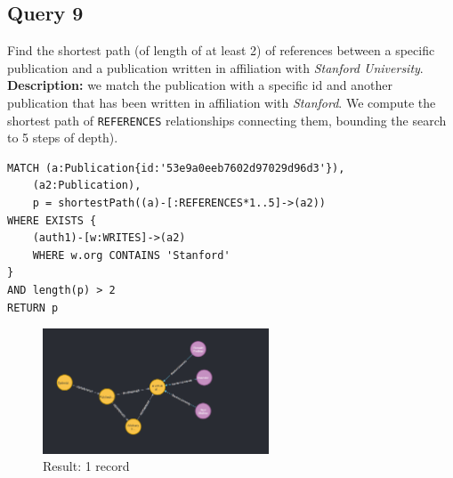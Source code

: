 \documentclass{Configuration_Files/PoliMi3i_thesis}
\begin{document}
\subsection{Query 9}
Find the shortest path (of length of at least 2) of references between a specific publication and a publication written in
affiliation with \emph{Stanford University}.\\
\textbf{Description:} we match the publication with a specific id and another publication that has been written in
affiliation with \emph{Stanford}. We compute the shortest path of \verb |REFERENCES| relationships connecting them, bounding
the search to 5 steps of depth).
\begin{lstlisting}[language=cypher, label=lst:cypher-example]
MATCH (a:Publication{id:'53e9a0eeb7602d97029d96d3'}),
    (a2:Publication),
    p = shortestPath((a)-[:REFERENCES*1..5]->(a2))
WHERE EXISTS {
    (auth1)-[w:WRITES]->(a2)
    WHERE w.org CONTAINS 'Stanford'
}
AND length(p) > 2
RETURN p
\end{lstlisting}
\begin{figure}[H]
\centering
\includegraphics[width=0.6\textwidth]{query/query9.PNG}
\caption{Result: 1 record}
\label{fig:query9}
\end{figure}
\end{document}
